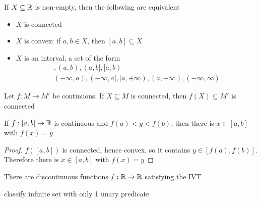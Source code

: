 \documentclass[11pt]{article}
\begin{document}
\begin{proposition}[]
If \(X\subseteq\mathbb{R}\) is non-empty, then the following are equivalent
\begin{itemize}
\item \(X\) is connected
\item \(X\) is convex: if \(a,b\in X\), then \([a,b]\subseteq X\)
\item \(X\) is an interval, a set of the form
\begin{gather*}
[a,b],(a,b),(a,b],[a,b)\\
(-\infty,a),(-\infty,a],[a,+\infty),(a,+\infty),(-\infty,\infty)
\end{gather*}
\end{itemize}
\end{proposition}

\begin{proposition}[]
Let \(f:M\to M'\) be continuous. If \(X\subseteq M\) is connected, then \(f(X)\subseteq M'\) is connected
\end{proposition}

\begin{corollary}
If \(f:[a,b]\to\mathbb{R}\) is continuous and \(f(a)<y<f(b)\), then there is \(x\in[a,b]\) with \(f(x)=y\)
\end{corollary}

\begin{proof}
\(f([a,b])\) is connected, hence convex, so it contains \(y\in[f(a),f(b)]\). Therefore there
is \(x\in[a,b]\) with \(f(x)=y\)
\end{proof}

There are discontinuous functions \(f:\mathbb{R}\to\mathbb{R}\) satisfying the IVT

classify infinite set with only 1 unary predicate
\end{document}
